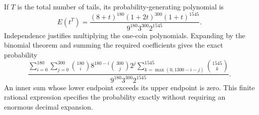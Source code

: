 If $T$ is the total number of tails, its probability-generating polynomial is\[E(t^T)=\dfrac{(8+t)^{180}(1+2t)^{300}(1+t)^{1545}}{9^{180}3^{300}2^{1545}}.\]Independence justifies multiplying the one-coin polynomials. Expanding by the binomial theorem and summing the required coefficients gives the exact probability\[\boxed{\dfrac{\displaystyle\sum_{i=0}^{180}\sum_{j=0}^{300}\binom{180}{i}8^{180-i}\binom{300}{j}2^j\sum_{k=\max(0,1300-i-j)}^{1545}\binom{1545}{k}}{9^{180}3^{300}2^{1545}}}.\]An inner sum whose lower endpoint exceeds its upper endpoint is zero. This finite rational expression specifies the probability exactly without requiring an enormous decimal expansion.
